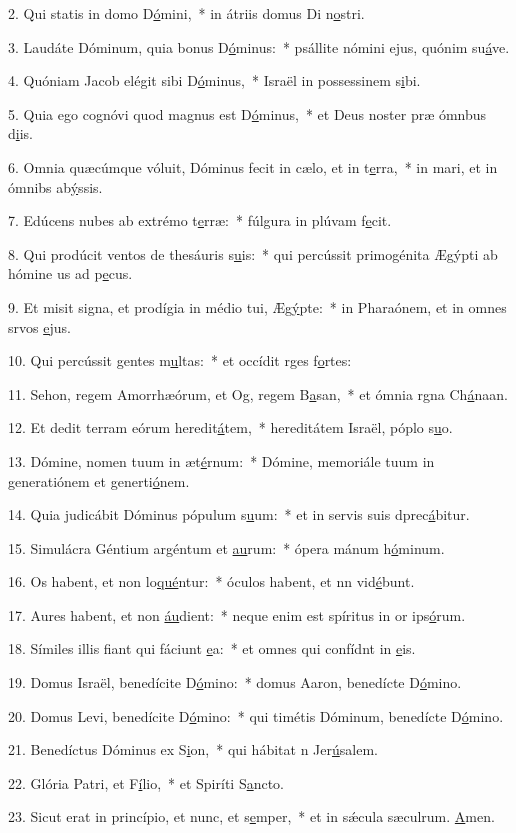 2. Qui statis in domo D\uline{ó}mini,~* in átriis domus Di n\uline{o}stri.\par 
3. Laudáte Dóminum, quia bonus D\uline{ó}minus:~* psállite nómini ejus, quónim su\uline{á}ve.\par 
4. Quóniam Jacob elégit sibi D\uline{ó}minus,~* Israël in possessinem s\uline{i}bi.\par 
5. Quia ego cognóvi quod magnus est D\uline{ó}minus,~* et Deus noster præ ómnbus d\uline{i}is.\par 
6. Omnia quæcúmque vóluit, Dóminus fecit in cælo, et in t\uline{e}rra,~* in mari, et in ómnibs ab\uline{ý}ssis.\par 
7. Edúcens nubes ab extrémo t\uline{e}rræ:~* fúlgura in plúvam f\uline{e}cit.\par 
8. Qui prodúcit ventos de thesáuris s\uline{u}is:~* qui percússit primogénita Ægýpti ab hómine us ad p\uline{e}cus.\par 
9. Et misit signa, et prodígia in médio tui, Æg\uline{ý}pte:~* in Pharaónem, et in omnes srvos \uline{e}jus.\par 
10. Qui percússit gentes m\uline{u}ltas:~* et occídit rges f\uline{o}rtes:\par 
11. Sehon, regem Amorrhæórum, et Og, regem B\uline{a}san,~* et ómnia rgna Ch\uline{á}naan.\par 
12. Et dedit terram eórum heredit\uline{á}tem,~* hereditátem Israël, póplo s\uline{u}o.\par 
13. Dómine, nomen tuum in æt\uline{é}rnum:~* Dómine, memoriále tuum in generatiónem et generti\uline{ó}nem.\par 
14. Quia judicábit Dóminus pópulum s\uline{u}um:~* et in servis suis dprec\uline{á}bitur.\par 
15. Simulácra Géntium argéntum et \uline{au}rum:~* ópera mánum h\uline{ó}minum.\par 
16. Os habent, et non lo\uline{qué}ntur:~* óculos habent, et nn vid\uline{é}bunt.\par 
17. Aures habent, et non \uline{áu}dient:~* neque enim est spíritus in or ips\uline{ó}rum.\par 
18. Símiles illis fiant qui fáciunt \uline{e}a:~* et omnes qui confídnt in \uline{e}is.\par 
19. Domus Israël, benedícite D\uline{ó}mino:~* domus Aaron, benedícte D\uline{ó}mino.\par 
20. Domus Levi, benedícite D\uline{ó}mino:~* qui timétis Dóminum, benedícte D\uline{ó}mino.\par 
21. Benedíctus Dóminus ex S\uline{i}on,~* qui hábitat n Jer\uline{ú}salem.\par 
22. Glória Patri, et F\uline{í}lio,~* et Spiríti S\uline{a}ncto.\par 
23. Sicut erat in princípio, et nunc, et s\uline{e}mper,~* et in sǽcula sæculrum. \uline{A}men.\par 
